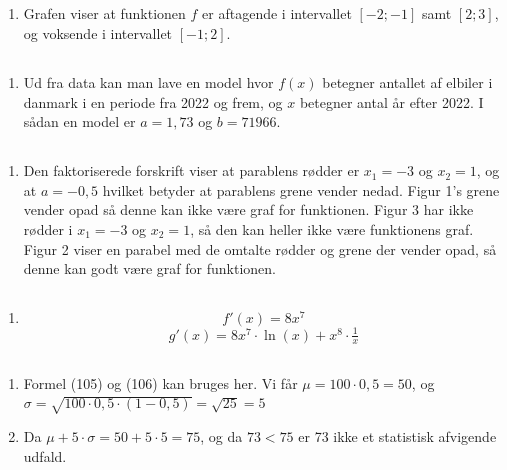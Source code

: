 \documentclass[10pt,a4paper,table]{article}
\begin{document}
\subsection{}
\begin{enumerate}
  \item Grafen viser at funktionen $f$ er aftagende i intervallet $[-2;-1]$ samt $[2;3]$, og voksende i intervallet $[-1;2]$.
\end{enumerate}

\subsection{}
\begin{enumerate}
  \item Ud fra data kan man lave en model hvor $f(x)$ betegner antallet af elbiler i danmark i en periode fra 2022 og frem, og $x$ betegner antal år efter 2022. I sådan en model er $a=1{,}73$ og $b=71966$.
\end{enumerate}

\subsection{}
\begin{enumerate}
  \item Den faktoriserede forskrift viser at parablens rødder er $x_1=-3$ og $x_2=1$, og at $a=-0{,}5$ hvilket betyder at parablens grene vender nedad. Figur 1's grene vender opad så denne kan ikke være graf for funktionen. Figur 3 har ikke rødder i $x_1=-3$ og $x_2=1$, så den kan heller ikke være funktionens graf. Figur 2 viser en parabel med de omtalte rødder og grene der vender opad, så denne kan godt være graf for funktionen.
\end{enumerate}

\subsection{}
\begin{enumerate}
  \item $$f'(x)=8x^7$$ $$g'(x)=8x^7\cdot \ln(x)+x^8\cdot \tfrac1x$$
\end{enumerate}

\subsection{}
\begin{enumerate}
  \item Formel (105) og (106) kan bruges her. Vi får $\mu = 100\cdot 0{,}5=50$, og $\sigma=\sqrt{100\cdot 0{,}5\cdot(1-0{,}5)}=\sqrt{25}=5$
  \item Da $\mu + 5\cdot \sigma=50+ 5\cdot 5=75$, og da $73<75$ er 73 ikke et statistisk afvigende udfald.
\end{enumerate}
\end{document}
